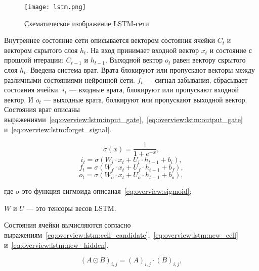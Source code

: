 \begin{figure}[h]
\centering
  \texttt{[image: lstm.png]}
  \caption{Схематическое изображение LSTM-сети}\label{fig:overview:lstm}
\end{figure}

Внутреннее состояние сети описывается вектором состояния ячейки $C_t$ и вектором скрытого слоя $h_t$. На вход принимает входной вектор $x_t$ и состояние с прошлой итерации: $C_{t-1}$ и $h_{t-1}$. Выходной вектор $o_t$ равен вектору скрытого слоя $h_t$. Введена система врат. Врата блокируют или пропускают векторы между различными состояниями нейронной сети. $f_{t}$ --- сигнал забывания, сбрасывает состояния ячейки. $i_{t}$ --- входные врата, блокируют или пропускают входной вектор. И $o_t$ --- выходные врата, болкируют или пропускают выходной вектор. Состояния врат описаны выражениями~\ref{eq:overview:lstm:input_gate},~\ref{eq:overview:lstm:output_gate} и~\ref{eq:overview:lstm:forget_signal}.

\begin{equation}
  \label{eq:overview:sigmoid}
  \sigma(x) = \frac{1}{1 + e^{-x}},
\end{equation}
\begin{equation}
  \label{eq:overview:lstm:input_gate}
  i_t = \sigma(W_{i}\cdot{x_t} + U_{i}\cdot{h_{t-1}} + b_i),
\end{equation}
\begin{equation}
  \label{eq:overview:lstm:forget_signal}
  f_t = \sigma(W_{f}\cdot{x_t} + U_{f}\cdot{h_{t-1}} + b_f),
\end{equation}
\begin{equation}
  \label{eq:overview:lstm:output_gate}
  o_t = \sigma(W_{o}\cdot{x_t} + U_{o}\cdot{h_{t-1}} + b_o),
\end{equation}
\begin{explanationx}
\item [где] $\sigma$ это функция сигмоида описаная~\ref{eq:overview:sigmoid};
\item $W$ и $U$ --- это тенсоры весов LSTM\@.
\end{explanationx}

Состояния ячейки вычисляются согласно выражениям~\ref{eq:overview:lstm:cell_candidate},~\ref{eq:overview:lstm:new_cell} и~\ref{eq:overview:lstm:new_hidden}.

\begin{equation}
  \label{eq:overview:hadamar}
  {(A\odot{B})}_{i,j} = {(A)}_{i,j}\cdot{{(B)}_{i,j}},
\end{equation}

